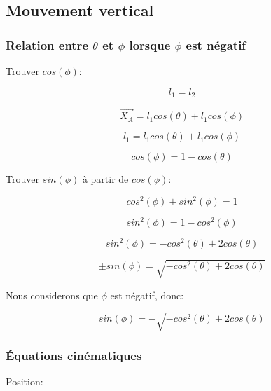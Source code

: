 \documentclass{article}
\begin{document}
\subsection{Mouvement vertical}
\subsubsection{Relation entre $\theta$ et $\phi$ lorsque $\phi$ est négatif}
\noindent Trouver $cos(\phi)$:

\begin{equation}
l_1 = l_2
\end{equation}

\begin{equation}
\overrightarrow{X_A} = l_1cos(\theta)+l_1cos(\phi)
\end{equation}

\begin{equation}
l_1 = l_1cos(\theta)+l_1cos(\phi)
\end{equation}

\begin{equation}
cos(\phi) = 1-cos(\theta)
\end{equation}

\newpage
\noindent Trouver $sin(\phi)$ à partir de $cos(\phi)$:

\begin{equation}
cos^2(\phi)+sin^2(\phi) = 1
\end{equation}

\begin{equation}
sin^2(\phi) = 1-cos^2(\phi)
\end{equation}

\begin{equation}
sin^2(\phi) = -cos^2(\theta)+2cos(\theta)
\end{equation}

\begin{equation}
\pm sin(\phi) = \sqrt{-cos^2(\theta)+2cos(\theta)}
\end{equation}

\noindent Nous considerons que $\phi$ est négatif, donc:

\begin{equation}
sin(\phi) = -\sqrt{-cos^2(\theta)+2cos(\theta)}
\end{equation}

\subsubsection{Équations cinématiques}
\noindent Position:
\end{document}
